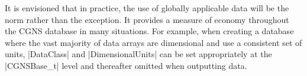It is envisioned that in practice, the use of globally applicable data will
be the norm rather than the exception.  It provides a measure of economy
throughout the CGNS database in many situations.  For example, when creating
a database where the vast majority of data arrays are dimensional and use a
consistent set of units, |DataClass| and |DimensionalUnits| can be set
appropriately at the |CGNSBase_t| level and thereafter omitted when
outputting data.
